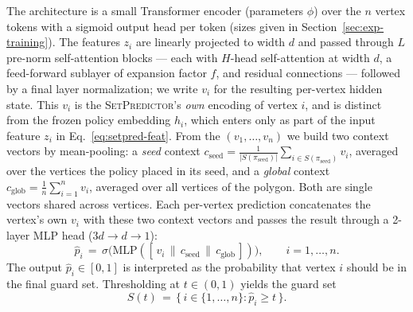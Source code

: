 \documentclass[preprint,10pt]{elsarticle}
\newcommand{\SetPredictor}{\textup{\textsc{SetPredictor}}}
\begin{document}
The architecture is a small Transformer encoder (parameters $\phi$) over the $n$ vertex tokens with a sigmoid output head per token (sizes given in Section~\ref{sec:exp-training}). The features $z_i$ are linearly projected to width $d$ and passed through $L$ pre-norm self-attention blocks --- each with $H$-head self-attention at width $d$, a feed-forward sublayer of expansion factor $f$, and residual connections --- followed by a final layer normalization; we write $v_i$ for the resulting per-vertex hidden state. This $v_i$ is the \SetPredictor{}'s \emph{own} encoding of vertex $i$, and is distinct from the frozen policy embedding $h_i$, which enters only as part of the input feature $z_i$ in Eq.~\eqref{eq:setpred-feat}. From the $(v_1, \dots, v_n)$ we build two context vectors by mean-pooling: a \emph{seed} context $c_{\mathrm{seed}} = \tfrac{1}{|S(\pi_{\mathrm{seed}})|}\sum_{i \in S(\pi_{\mathrm{seed}})} v_i$, averaged over the vertices the policy placed in its seed, and a \emph{global} context $c_{\mathrm{glob}} = \tfrac{1}{n}\sum_{i=1}^{n} v_i$, averaged over all vertices of the polygon. Both are single vectors shared across vertices. Each per-vertex prediction concatenates the vertex's own $v_i$ with these two context vectors and passes the result through a 2-layer MLP head ($3d \to d \to 1$):
\begin{equation}
\hat{p}_i \,=\, \sigma\!\big( \mathrm{MLP}([\, v_i \,\|\, c_{\mathrm{seed}} \,\|\, c_{\mathrm{glob}} \,]) \big),\qquad i = 1, \dots, n.
\label{eq:setpred-arch}
\end{equation}
The output $\hat{p}_i \in [0,1]$ is interpreted as the probability that vertex $i$ should be in the final guard set. Thresholding at $t \in (0,1)$ yields the guard set
\begin{equation}
S(t) \,=\, \{\, i \in \{1, \dots, n\} : \hat{p}_i \geq t \,\}.
\label{eq:setpred-decode}
\end{equation}
\end{document}

